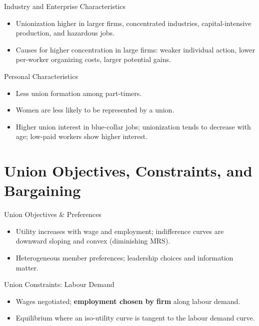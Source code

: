 \documentclass[aspectratio=169]{beamer}
\begin{document}
\begin{frame}{Industry and Enterprise Characteristics}
\transfade
\begin{itemize}[<+->]
  \item Unionization higher in larger firms, concentrated industries, capital-intensive production, and hazardous jobs.
  \item Causes for higher concentration in large firms: weaker individual action, lower per-worker organizing costs, larger potential gains.
\end{itemize}
\end{frame}

\begin{frame}{Personal Characteristics}
\transfade
\begin{itemize}[<+->]
  \item Less union formation among part-timers.
  \item Women are less likely to be represented by a union.
  \item Higher union interest in blue-collar jobs; unionization tends to decrease with age; low-paid workers show higher interest.
\end{itemize}
\end{frame}

\section{Union Objectives, Constraints, and Bargaining}

\begin{frame}{Union Objectives \& Preferences}
\transfade
\begin{itemize}[<+->]
  \item Utility increases with wage and employment; indifference curves are downward sloping and convex (diminishing MRS).
  \item Heterogeneous member preferences; leadership choices and information matter.
\end{itemize}
\end{frame}

\begin{frame}{Union Constraints: Labour Demand}
\transfade
\begin{itemize}[<+->]
  \item Wages negotiated; \textbf{employment chosen by firm} along labour demand.
  \item Equilibrium where an iso-utility curve is tangent to the labour demand curve.
\end{itemize}
\end{frame}
\end{document}
